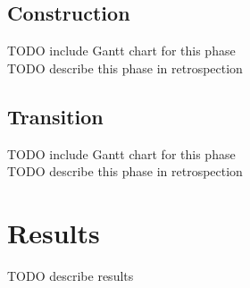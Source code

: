 \subsection*{Construction}
TODO include Gantt chart for this phase\\
TODO describe this phase in retrospection\\

\subsection*{Transition}
TODO include Gantt chart for this phase\\
TODO describe this phase in retrospection\\

\section*{Results}
TODO describe results\\
